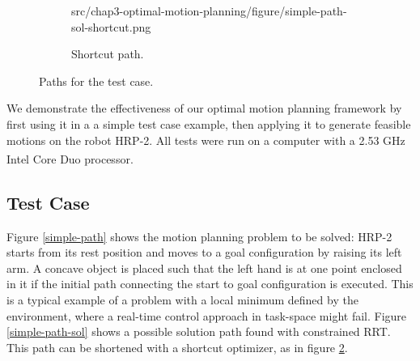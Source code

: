 \begin{figure}
\begin{subfigure}{0.32\columnwidth}
                    {src/chap3-optimal-motion-planning/figure/simple-path-sol-shortcut.png}
    \caption{Shortcut path.}
    \label{simple-path-sol-shortcut}
  \end{subfigure}
  \caption{Paths for the test case.}
\end{figure}

We demonstrate the effectiveness of our optimal motion planning
framework by first using it in a a simple test case example, then
applying it to generate feasible motions on the robot HRP-2. All tests
were run on a computer with a 2.53 GHz
Intel\textsuperscript{\textregistered} Core Duo
processor.

\subsection{Test Case}
\label{test-case}
Figure \ref{simple-path} shows the motion planning problem to be
solved: HRP-2 starts from its rest position and moves to a goal
configuration by raising its left arm. A concave object is placed such
that the left hand is at one point enclosed in it if the initial path
connecting the start to goal configuration is executed. This is a
typical example of a problem with a local minimum defined by the
environment, where a real-time control approach in task-space might
fail. Figure \ref{simple-path-sol} shows a possible solution path
found with constrained RRT. This path can be shortened with a shortcut
optimizer, as in figure \ref{simple-path-sol-shortcut}.

